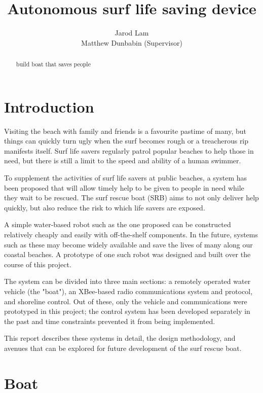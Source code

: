 \documentclass[a4paper]{IEEEtran}
\title{\vspace{5.0cm}Autonomous surf life saving device}
\author{Jarod Lam\\Matthew Dunbabin (Supervisor)}
\begin{document}
\begin{minipage}{\textwidth}
\vfill
\maketitle
\vfill
\end{minipage}
\clearpage

\tableofcontents

\begin{abstract}
build boat that saves people
\end{abstract}

\section{Introduction}
Visiting the beach with family and friends is a favourite pastime of many, but things can quickly turn ugly when the surf becomes rough or a treacherous rip manifests itself. Surf life savers regularly patrol popular beaches to help those in need, but there is still a limit to the speed and ability of a human swimmer.

To supplement the activities of surf life savers at public beaches, a system has been proposed that will allow timely help to be given to people in need while they wait to be rescued. The surf rescue boat (SRB) aims to not only deliver help quickly, but also reduce the risk to which life savers are exposed.

A simple water-based robot such as the one proposed can be constructed relatively cheaply and easily with off-the-shelf components. In the future, systems such as these may become widely available and save the lives of many along our coastal beaches. A prototype of one such robot was designed and built over the course of this project.

The system can be divided into three main sections: a remotely operated water vehicle (the "boat"), an XBee-based radio communications system and protocol, and shoreline control. Out of these, only the vehicle and communications were prototyped in this project; the control system has been developed separately in the past and time constraints prevented it from being implemented.

This report describes these systems in detail, the design methodology, and avenues that can be explored for future development of the surf rescue boat.

\section{Boat}
\end{document}
